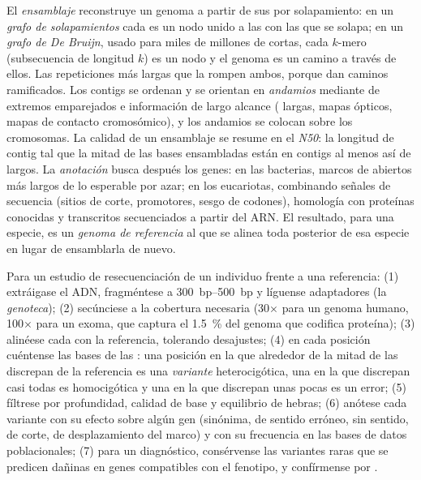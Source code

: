 \begin{definition}\label{def:b3:genomics:assembly}
El \emph{ensamblaje} reconstruye un genoma a partir de sus  por
solapamiento: en un \emph{grafo de solapamientos} cada  es un nodo
unido a las  con las que se solapa; en un \emph{grafo de De
Bruijn}, usado para miles de millones de  cortas, cada $k$-mero
(subsecuencia de longitud $k$) es un nodo y el genoma es un camino a
través de ellos. Las repeticiones más largas que la  rompen ambos,
porque dan caminos ramificados. Los contigs se ordenan y se orientan en
\emph{andamios} mediante  de extremos emparejados e información
de largo alcance ( largas, mapas ópticos, mapas de contacto
cromosómico), y los andamios se colocan sobre los cromosomas. La calidad
de un ensamblaje se resume en el \emph{N50}: la longitud de contig tal
que la mitad de las bases ensambladas están en contigs al menos así de
largos. La \emph{anotación} busca después los genes: en las bacterias,
marcos de  abiertos más largos de lo esperable por azar; en los
eucariotas, combinando señales de secuencia (sitios de corte, promotores,
sesgo de codones), homología con proteínas conocidas y transcritos
secuenciados a partir del ARN. El resultado, para una especie, es un
\emph{genoma de referencia} al que se alinea toda  posterior de
esa especie en lugar de ensamblarla de nuevo.
\end{definition}

\begin{method}\label{met:b3:genomics:pipeline}
Para un estudio de resecuenciación de un individuo frente a una
referencia: (1) extráigase el ADN, fragméntese a \qtyrange{300}{500}{bp}
y líguense adaptadores (la \emph{genoteca}); (2) secúnciese a la
cobertura necesaria (30$\times$ para un genoma humano, 100$\times$ para
un exoma, que captura el \qty{1.5}{\%} del genoma que codifica proteína);
(3) alinéese cada  con la referencia, tolerando desajustes; (4) en
cada posición cuéntense las bases de las : una posición en la que
alrededor de la mitad de las  discrepan de la referencia es una
\emph{variante} heterocigótica, una en la que discrepan casi todas es
homocigótica y una en la que discrepan unas pocas es un error; (5)
fíltrese por profundidad, calidad de base y equilibrio de hebras; (6)
anótese cada variante con su efecto sobre algún gen (sinónima, de sentido
erróneo, sin sentido, de corte, de desplazamiento del marco) y con su
frecuencia en las bases de datos poblacionales; (7) para un diagnóstico,
consérvense las variantes raras que se predicen dañinas en genes
compatibles con el fenotipo, y confírmense por .
\end{method}

